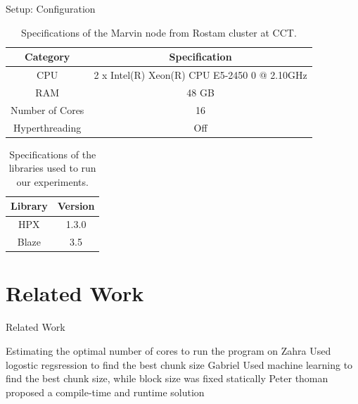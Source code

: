 \documentclass[10pt]{beamer}
\begin{document}
\begin{frame}{Setup: Configuration}
	\begin{outline}
	\vspace{\baselineskip}	
	\begin{table}[H]
		\centering
		\scalebox{0.75}
		{\begin{tabular}{|c | c |} 
				\hline
				
				Category & Specification\\
				\hline
				\hline
				CPU &  2 x Intel(R) Xeon(R) CPU E5-2450 0 @ 2.10GHz \\ [0.5ex] 
				\hline
				RAM & 48 GB\\ 	
				\hline
				Number of Cores & 16\\
				\hline	
				Hyperthreading & Off \\
				\hline			
		\end{tabular}}	
		\caption{Specifications of the Marvin node from Rostam cluster at CCT.}
		\label{table3}
	\end{table} 
\begin{table}[H]
	\centering
	\scalebox{0.75}
	{\begin{tabular}{|c | c |} 
			\hline
			Library & Version \\
			\hline
			\hline
			HPX & 1.3.0 \\ 
			\hline
			Blaze & 3.5\\ 	
			\hline
			
	\end{tabular}}	
	\caption{Specifications of the libraries used to run our experiments.}
	\label{table5}
\end{table}
	\end{outline}
\end{frame}

\section{Related Work}
	\begin{frame}{Related Work}
		\begin{outline}
			\1Estimating the optimal number of cores to run the program on
			\1Zahra Used logostic regsression to find the best chunk size
			\1Gabriel Used machine learning to find the best chunk size, while block size was fixed statically
			\1Peter thoman proposed a compile-time and runtime solution 
		\end{outline}
\end{frame}
\end{document}
